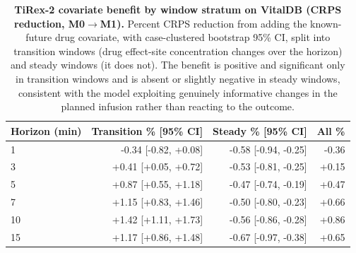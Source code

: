 \begin{table}[ht]
\centering\footnotesize
\caption{\textbf{TiRex-2 covariate benefit by window stratum on VitalDB (CRPS reduction, M0$\rightarrow$M1).} Percent CRPS reduction from adding the known-future drug covariate, with case-clustered bootstrap 95\% CI, split into transition windows (drug effect-site concentration changes over the horizon) and steady windows (it does not). The benefit is positive and significant only in transition windows and is absent or slightly negative in steady windows, consistent with the model exploiting genuinely informative changes in the planned infusion rather than reacting to the outcome.}
\label{tab:covariate_split}
\begin{tabular}{lrrr}
\toprule
Horizon (min) & Transition \% [95\% CI] & Steady \% [95\% CI] & All \% \\
\midrule
1 & -0.34 [-0.82, +0.08] & -0.58 [-0.94, -0.25] & -0.36 \\
3 & +0.41 [+0.05, +0.72] & -0.53 [-0.81, -0.25] & +0.15 \\
5 & +0.87 [+0.55, +1.18] & -0.47 [-0.74, -0.19] & +0.47 \\
7 & +1.15 [+0.83, +1.46] & -0.50 [-0.80, -0.23] & +0.66 \\
10 & +1.42 [+1.11, +1.73] & -0.56 [-0.86, -0.28] & +0.86 \\
15 & +1.17 [+0.86, +1.48] & -0.67 [-0.97, -0.38] & +0.65 \\
\bottomrule
\end{tabular}
\end{table}


